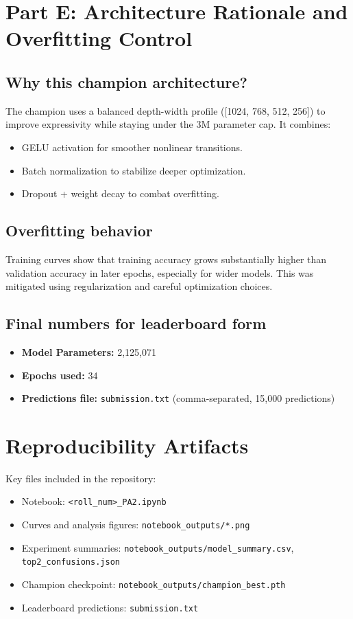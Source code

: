 \documentclass[11pt,a4paper]{article}
\begin{document}
\section{Part E: Architecture Rationale and Overfitting Control}
\subsection{Why this champion architecture?}
The champion uses a balanced depth-width profile ([1024, 768, 512, 256]) to improve expressivity while staying under the 3M parameter cap. It combines:
\begin{itemize}[leftmargin=1.5em]
    \item GELU activation for smoother nonlinear transitions.
    \item Batch normalization to stabilize deeper optimization.
    \item Dropout + weight decay to combat overfitting.
\end{itemize}

\subsection{Overfitting behavior}
Training curves show that training accuracy grows substantially higher than validation accuracy in later epochs, especially for wider models. This was mitigated using regularization and careful optimization choices.

\subsection{Final numbers for leaderboard form}
\begin{itemize}[leftmargin=1.5em]
    \item \textbf{Model Parameters:} 2,125,071
    \item \textbf{Epochs used:} 34
    \item \textbf{Predictions file:} \texttt{submission.txt} (comma-separated, 15,000 predictions)
\end{itemize}

\section{Reproducibility Artifacts}
Key files included in the repository:
\begin{itemize}[leftmargin=1.5em]
    \item Notebook: \texttt{<roll\_num>\_PA2.ipynb}
    \item Curves and analysis figures: \texttt{notebook\_outputs/*.png}
    \item Experiment summaries: \texttt{notebook\_outputs/model\_summary.csv}, \texttt{top2\_confusions.json}
    \item Champion checkpoint: \texttt{notebook\_outputs/champion\_best.pth}
    \item Leaderboard predictions: \texttt{submission.txt}
\end{itemize}
\end{document}
